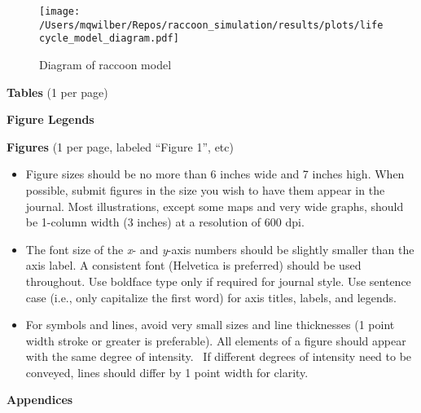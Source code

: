 \documentclass[11pt]{article}
\begin{document}
\begin{figure}
    \texttt{[image: /Users/mqwilber/Repos/raccoon\_simulation/results/plots/lifecycle\_model\_diagram.pdf]}
    \caption{Diagram of raccoon model}
    \label{fig:mod_diagram}
\end{figure}

\textbf{Tables} (1 per page)

\textbf{Figure Legends}

\textbf{Figures} (1 per page, labeled ``Figure 1'', etc)

\begin{itemize}
\item
  Figure sizes should be no more than 6 inches wide and 7 inches high.
  When possible, submit figures in the size you wish to have them appear
  in the journal. Most illustrations, except some maps and very wide
  graphs, should be 1-column width (3 inches) at a resolution of 600
  dpi.
\item
  The font size of the \emph{x}- and \emph{y}-axis numbers should be
  slightly smaller than the axis label. A consistent font (Helvetica is
  preferred) should be used throughout. Use boldface type only if
  required for journal style. Use sentence case (i.e., only capitalize
  the first word) for axis titles, labels, and legends.
\item
  For symbols and lines, avoid very small sizes and line thicknesses (1
  point width stroke or greater is preferable). All elements of a figure
  should appear with the same degree of intensity.~ If different degrees
  of intensity need to be conveyed, lines should differ by 1 point width
  for clarity.
\end{itemize}

\textbf{Appendices}



\end{document}
